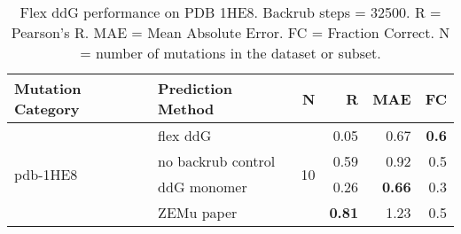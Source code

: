 \begin{table}
  \begin{tabular}{llrrrr}
\toprule
Mutation Category &   Prediction Method &   N &    R &  MAE &  FC \\
\midrule
 \multirow{ 4}{*}{pdb-1HE8} & flex ddG & \multirow{ 4}{*}{10} & 0.05 & 0.67 & \textbf{0.6}  \\
 & no backrub control & & 0.59 & 0.92 & 0.5  \\
 & ddG monomer & & 0.26 & \textbf{0.66} & 0.3  \\
 & ZEMu paper & & \textbf{0.81} & 1.23 & 0.5  \\
\bottomrule
\end{tabular}
  \caption[Flex ddG performance on PDB 1HE8]{
    Flex ddG performance on PDB 1HE8. Backrub steps = 32500. R = Pearson's R. MAE = Mean Absolute Error. FC = Fraction Correct. N = number of mutations in the dataset or subset.
  } \label{tab:table-pdb-1HE8}
\end{table}
